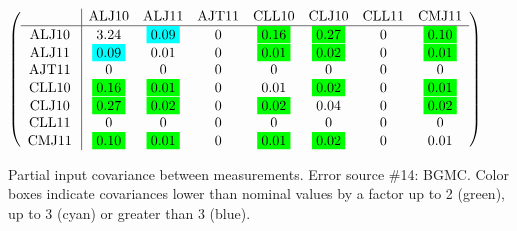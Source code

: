 \begin{table}[H]
\scriptsize
\begin{center}
\renewcommand{\arraystretch}{1.1}
\begin{math}\left(\begin{array}{c|ccccccc}
 & \mathrm{ALJ10} & 
\mathrm{ALJ11} & 
\mathrm{AJT11} & 
\mathrm{CLL10} & 
\mathrm{CLJ10} & 
\mathrm{CLL11} & 
\mathrm{CMJ11} \\
\hline
\mathrm{ALJ10} \hspace*{2pt} &       3.24 &  \colorbox{Cyan1}{$      0.09$} &  0 &  \colorbox{Green1}{$      0.16$} &  \colorbox{Green1}{$      0.27$} &  0 &  \colorbox{Green1}{$      0.10$} \\
\mathrm{ALJ11} \hspace*{2pt} &  \colorbox{Cyan1}{$      0.09$} &       0.01 &  0 &  \colorbox{Green1}{$      0.01$} &  \colorbox{Green1}{$      0.02$} &  0 &  \colorbox{Green1}{$      0.01$} \\
\mathrm{AJT11} \hspace*{2pt} &  0 &  0 &  0 &  0 &  0 &  0 &  0 \\
\mathrm{CLL10} \hspace*{2pt} &  \colorbox{Green1}{$      0.16$} &  \colorbox{Green1}{$      0.01$} &  0 &       0.01 &  \colorbox{Green1}{$      0.02$} &  0 &  \colorbox{Green1}{$      0.01$} \\
\mathrm{CLJ10} \hspace*{2pt} &  \colorbox{Green1}{$      0.27$} &  \colorbox{Green1}{$      0.02$} &  0 &  \colorbox{Green1}{$      0.02$} &       0.04 &  0 &  \colorbox{Green1}{$      0.02$} \\
\mathrm{CLL11} \hspace*{2pt} &  0 &  0 &  0 &  0 &  0 &  0 &  0 \\
\mathrm{CMJ11} \hspace*{2pt} &  \colorbox{Green1}{$      0.10$} &  \colorbox{Green1}{$      0.01$} &  0 &  \colorbox{Green1}{$      0.01$} &  \colorbox{Green1}{$      0.02$} &  0 &       0.01 \\
\end{array}\right)\end{math}
\caption{Partial input covariance between measurements. Error source \#14: BGMC. Color boxes indicate covariances lower than nominal values by a factor up to 2 (green), up to 3 (cyan) or greater than 3 (blue).}
\renewcommand{\arraystretch}{1}
\end{center}
\end{table}
